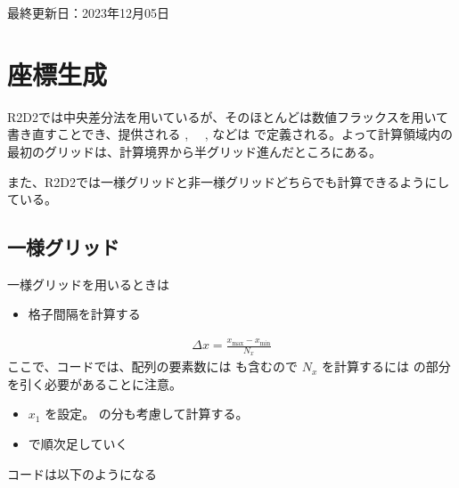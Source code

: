 \documentclass[letterpaper,10pt,dvipdfmx,report]{sphinxmanual}
\begin{document}
\sphinxAtStartPar
最終更新日：2023年12月05日

\sphinxstepscope


\chapter{座標生成}
\label{\detokenize{geometry:id1}}\label{\detokenize{geometry::doc}}
\sphinxAtStartPar
R2D2では中央差分法を用いているが、そのほとんどは数値フラックスを用いて書き直すことでき、提供される  , 　,  などは  で定義される。よって計算領域内の最初のグリッドは、計算境界から半グリッド進んだところにある。

\sphinxAtStartPar
また、R2D2では一様グリッドと非一様グリッドどちらでも計算できるようにしている。


\section{一様グリッド}
\label{\detokenize{geometry:id2}}
\sphinxAtStartPar
一様グリッドを用いるときは
\begin{itemize}
\item {} 
\sphinxAtStartPar
格子間隔を計算する

\end{itemize}
\begin{equation*}
\begin{split}\Delta x = \frac{x_\mathrm{max} - x_\mathrm{min}}{N_x}\end{split}
\end{equation*}
\sphinxAtStartPar
ここで、コードでは、配列の要素数には  も含むので
\(N_x\) を計算するには  の部分を引く必要があることに注意。
\begin{itemize}
\item {} 
\sphinxAtStartPar
\(x_1\) を設定。 の分も考慮して計算する。

\item {} 
\sphinxAtStartPar
{} で順次足していく

\end{itemize}

\sphinxAtStartPar
コードは以下のようになる
\end{document}
